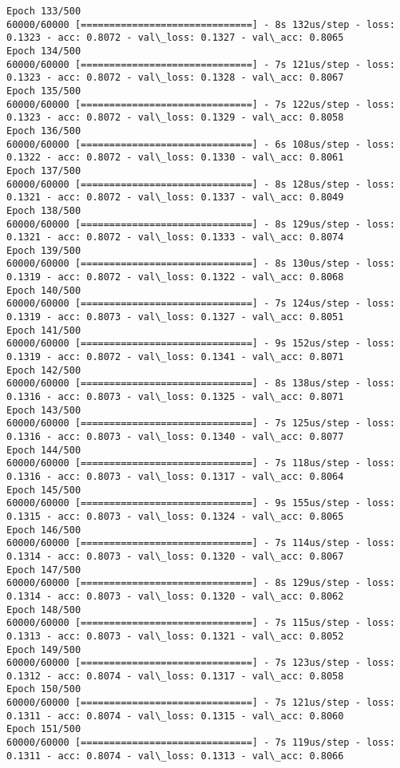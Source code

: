\documentclass[11pt]{article}
\begin{document}
\begin{Verbatim}[commandchars=\\\{\}]
Epoch 133/500
60000/60000 [==============================] - 8s 132us/step - loss: 0.1323 - acc: 0.8072 - val\_loss: 0.1327 - val\_acc: 0.8065
Epoch 134/500
60000/60000 [==============================] - 7s 121us/step - loss: 0.1323 - acc: 0.8072 - val\_loss: 0.1328 - val\_acc: 0.8067
Epoch 135/500
60000/60000 [==============================] - 7s 122us/step - loss: 0.1323 - acc: 0.8072 - val\_loss: 0.1329 - val\_acc: 0.8058
Epoch 136/500
60000/60000 [==============================] - 6s 108us/step - loss: 0.1322 - acc: 0.8072 - val\_loss: 0.1330 - val\_acc: 0.8061
Epoch 137/500
60000/60000 [==============================] - 8s 128us/step - loss: 0.1321 - acc: 0.8072 - val\_loss: 0.1337 - val\_acc: 0.8049
Epoch 138/500
60000/60000 [==============================] - 8s 129us/step - loss: 0.1321 - acc: 0.8072 - val\_loss: 0.1333 - val\_acc: 0.8074
Epoch 139/500
60000/60000 [==============================] - 8s 130us/step - loss: 0.1319 - acc: 0.8072 - val\_loss: 0.1322 - val\_acc: 0.8068
Epoch 140/500
60000/60000 [==============================] - 7s 124us/step - loss: 0.1319 - acc: 0.8073 - val\_loss: 0.1327 - val\_acc: 0.8051
Epoch 141/500
60000/60000 [==============================] - 9s 152us/step - loss: 0.1319 - acc: 0.8072 - val\_loss: 0.1341 - val\_acc: 0.8071
Epoch 142/500
60000/60000 [==============================] - 8s 138us/step - loss: 0.1316 - acc: 0.8073 - val\_loss: 0.1325 - val\_acc: 0.8071
Epoch 143/500
60000/60000 [==============================] - 7s 125us/step - loss: 0.1316 - acc: 0.8073 - val\_loss: 0.1340 - val\_acc: 0.8077
Epoch 144/500
60000/60000 [==============================] - 7s 118us/step - loss: 0.1316 - acc: 0.8073 - val\_loss: 0.1317 - val\_acc: 0.8064
Epoch 145/500
60000/60000 [==============================] - 9s 155us/step - loss: 0.1315 - acc: 0.8073 - val\_loss: 0.1324 - val\_acc: 0.8065
Epoch 146/500
60000/60000 [==============================] - 7s 114us/step - loss: 0.1314 - acc: 0.8073 - val\_loss: 0.1320 - val\_acc: 0.8067
Epoch 147/500
60000/60000 [==============================] - 8s 129us/step - loss: 0.1314 - acc: 0.8073 - val\_loss: 0.1320 - val\_acc: 0.8062
Epoch 148/500
60000/60000 [==============================] - 7s 115us/step - loss: 0.1313 - acc: 0.8073 - val\_loss: 0.1321 - val\_acc: 0.8052
Epoch 149/500
60000/60000 [==============================] - 7s 123us/step - loss: 0.1312 - acc: 0.8074 - val\_loss: 0.1317 - val\_acc: 0.8058
Epoch 150/500
60000/60000 [==============================] - 7s 121us/step - loss: 0.1311 - acc: 0.8074 - val\_loss: 0.1315 - val\_acc: 0.8060
Epoch 151/500
60000/60000 [==============================] - 7s 119us/step - loss: 0.1311 - acc: 0.8074 - val\_loss: 0.1313 - val\_acc: 0.8066

\end{Verbatim}
\end{document}
